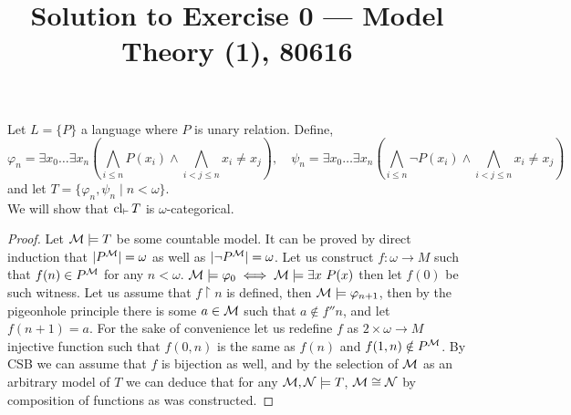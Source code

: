 
\title{Solution to Exercise 0 --- Model Theory (1), 80616}


\maketitle
\maketitleprint[yellow]

\question{}
Let $L = \{ P \}$ a language where $P$ is unary relation.
Define,
\[
	\varphi_n
	= \exists x_0 \ldots \exists x_n \left( \bigwedge_{i \le n} P(x_i) \land \bigwedge_{i < j \le n} x_i \ne x_j \right),
	\quad
	\psi_n
	= \exists x_0 \ldots \exists x_n \left( \bigwedge_{i \le n} \lnot P(x_i) \land \bigwedge_{i < j \le n} x_i \ne x_j \right)
\]
and let $T = \{ \varphi_n, \psi_n \mid n < \omega \}$. \\
We will show that $\operatorname{cl}_{\vdash} T$ is $\omega$-categorical.
\begin{proof}
	Let $\mathcal{M} \models T$ be some countable model.
	It can be proved by direct induction that $|P^{\mathcal{M}}| = \omega$ as well as $|\lnot P^{\mathcal{M}}| = \omega$.
	Let us construct $f : \omega \to M$ such that $f(n) \in P^{\mathcal{M}}$ for any $n < \omega$.
	$\mathcal{M} \models \varphi_0 \iff \mathcal{M} \models \exists x\ P(x)$ then let $f(0)$ be such witness.
	Let us assume that $f \restriction n$ is defined, then $\mathcal{M} \models \varphi_{n + 1}$, then by the pigeonhole principle there is some $a \in \mathcal{M}$ such that $a \notin f '' n$, and let $f(n + 1) = a$.
	For the sake of convenience let us redefine $f$ as $2 \times \omega \to M$ injective function such that $f(0, n)$ is the same as $f(n)$ and $f(1, n) \notin P^{\mathcal{M}}$.
	By CSB we can assume that $f$ is bijection as well, and by the selection of $\mathcal{M}$ as an arbitrary model of $T$ we can deduce that for any $\mathcal{M}, \mathcal{N} \models T$, $\mathcal{M} \cong \mathcal{N}$ by composition of functions as was constructed.
\end{proof}

